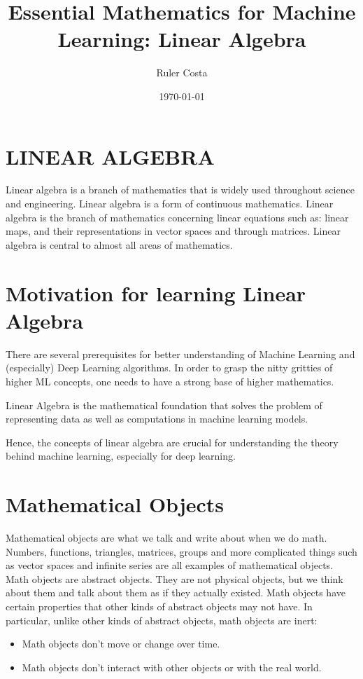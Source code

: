\documentclass[12pt]{article}
\title{Essential Mathematics for Machine Learning: Linear Algebra}
\author{Ruler Costa}
\date{\today}
\begin{document}
\maketitle

\section{LINEAR ALGEBRA}

Linear algebra is a branch of mathematics that is widely used throughout science and engineering. Linear algebra is a form of continuous mathematics. Linear algebra is the branch of mathematics concerning linear equations such as: linear maps, and their representations in vector spaces and through matrices. Linear algebra is central to almost all areas of mathematics.

\section{Motivation for learning Linear Algebra}

There are several prerequisites for better understanding of Machine Learning and (especially) Deep Learning algorithms. In order to grasp the nitty gritties of higher ML concepts, one needs to have a strong base of higher mathematics.

Linear Algebra is the mathematical foundation that solves the problem of representing data as well as computations in machine learning models.

Hence, the concepts of linear algebra are crucial for understanding the theory behind machine learning, especially for deep learning.

\section{Mathematical Objects}

Mathematical objects are what we talk and write about when we do math. Numbers, functions, triangles, matrices, groups and more complicated things such as vector spaces and infinite series are all examples of mathematical objects. Math objects are abstract objects. They are not physical objects, but we think about them and talk about them as if they actually existed. Math objects have certain properties that other kinds of abstract objects may not have. In particular, unlike other kinds of abstract objects, math objects are inert:
\begin{itemize}
    \item Math objects don't move or change over time.
    \item Math objects don't interact with other objects or with the real world.
\end{itemize}
\end{document}

